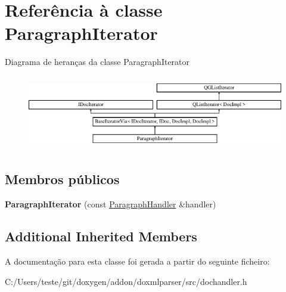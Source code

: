 \hypertarget{class_paragraph_iterator}{\section{Referência à classe Paragraph\-Iterator}
\label{class_paragraph_iterator}
}
Diagrama de heranças da classe Paragraph\-Iterator\begin{figure}[H]
\begin{center}
\leavevmode
\includegraphics[height=3.294118cm]{class_paragraph_iterator}
\end{center}
\end{figure}
\subsection*{Membros públicos}
\begin{DoxyCompactItemize}
\item 
\hypertarget{class_paragraph_iterator_abf097f096ab410657a943661797d9ddd}{{\bfseries Paragraph\-Iterator} (const \hyperlink{class_paragraph_handler}{Paragraph\-Handler} \&handler)}\label{class_paragraph_iterator_abf097f096ab410657a943661797d9ddd}

\end{DoxyCompactItemize}
\subsection*{Additional Inherited Members}


A documentação para esta classe foi gerada a partir do seguinte ficheiro\-:\begin{DoxyCompactItemize}
\item 
C\-:/\-Users/teste/git/doxygen/addon/doxmlparser/src/dochandler.\-h\end{DoxyCompactItemize}
